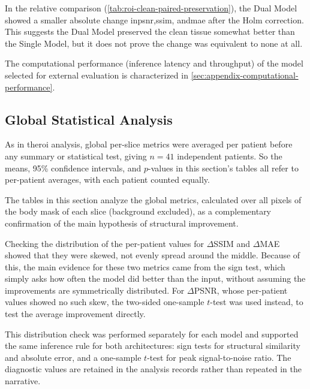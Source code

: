 In the relative comparison (\autoref{tab:roi-clean-paired-preservation}), the Dual Model showed a smaller absolute change in\acrshort{psnr},\acrshort{ssim}, and\acrshort{mae} after the Holm correction. This suggests the Dual Model preserved the clean tissue somewhat better than the Single Model, but it does not prove the change was equivalent to none at all.

The computational performance (inference latency and throughput) of the model selected for external evaluation is characterized in \autoref{sec:appendix-computational-performance}.

\subsection{Global Statistical Analysis}
As in the\acrshort{roi} analysis, global per-slice metrics were averaged per patient before any summary or statistical test, giving $n=41$ independent patients. So the means, 95\% confidence intervals, and $p$-values in this section's tables all refer to per-patient averages, with each patient counted equally.

The tables in this section analyze the global metrics, calculated over all pixels of the body mask of each slice (background excluded), as a complementary confirmation of the main hypothesis of structural improvement.

Checking the distribution of the per-patient values for $\Delta$SSIM and $\Delta$MAE showed that they were skewed, not evenly spread around the middle. Because of this, the main evidence for these two metrics came from the sign test, which simply asks how often the model did better than the input, without assuming the improvements are symmetrically distributed. For $\Delta$PSNR, whose per-patient values showed no such skew, the two-sided one-sample $t$-test was used instead, to test the average improvement directly.

This distribution check was performed separately for each model and supported the same inference rule for both architectures: sign tests for structural similarity and absolute error, and a one-sample $t$-test for peak signal-to-noise ratio. The diagnostic values are retained in the analysis records rather than repeated in the narrative.

